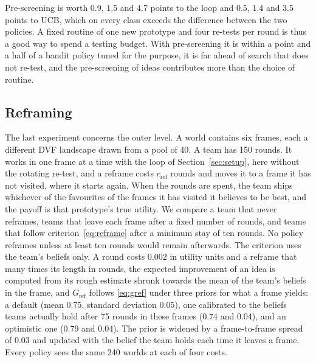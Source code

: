 \documentclass[10pt,twocolumn]{article}
\theoremstyle{definition}
\begin{document}
Pre-screening is worth 0.9, 1.5 and 4.7 points to the loop and 0.5, 1.4 and 3.5 points to UCB, which on every class exceeds the difference between the two policies. A fixed routine of one new prototype and four re-tests per round is thus a good way to spend a testing budget. With pre-screening it is within a point and a half of a bandit policy tuned for the purpose, it is far ahead of search that does not re-test, and the pre-screening of ideas contributes more than the choice of routine.

\subsection{Reframing}
\label{sec:reframesim}

The last experiment concerns the outer level. A world contains six frames, each a different DVF landscape drawn from a pool of 40. A team has 150 rounds. It works in one frame at a time with the loop of Section~\ref{sec:setup}, here without the rotating re-test, and a reframe costs $c_{\mathrm{ref}}$ rounds and moves it to a frame it has not visited, where it starts again. When the rounds are spent, the team ships whichever of the favourites of the frames it has visited it believes to be best, and the payoff is that prototype's true utility. We compare a team that never reframes, teams that leave each frame after a fixed number of rounds, and teams that follow criterion~\eqref{eq:reframe} after a minimum stay of ten rounds. No policy reframes unless at least ten rounds would remain afterwards. The criterion uses the team's beliefs only. A round costs $0.002$ in utility units and a reframe that many times its length in rounds, the expected improvement of an idea is computed from its rough estimate shrunk towards the mean of the team's beliefs in the frame, and $G_{\mathrm{ref}}$ follows \eqref{eq:gref} under three priors for what a frame yields: a default (mean $0.75$, standard deviation $0.05$), one calibrated to the beliefs teams actually hold after 75 rounds in these frames ($0.74$ and $0.04$), and an optimistic one ($0.79$ and $0.04$). The prior is widened by a frame-to-frame spread of $0.03$ and updated with the belief the team holds each time it leaves a frame. Every policy sees the same 240 worlds at each of four costs.
\end{document}
